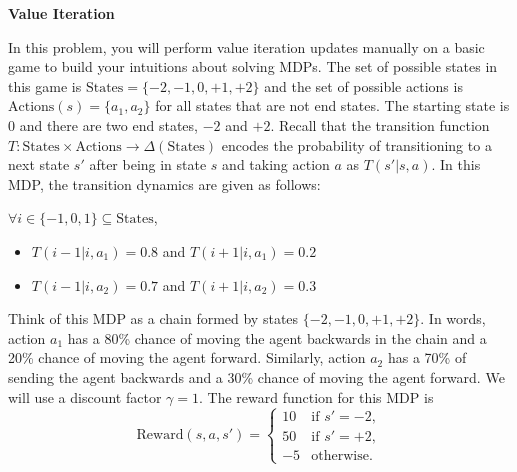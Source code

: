 \item {\bf Value Iteration}

In this problem, you will perform value iteration updates manually on a
basic game to build your intuitions about solving MDPs.
The set of possible states in this game is $\text{States} = \{-2, -1, 0, +1, +2\}$ and the set of possible actions is $\text{Actions}(s) = \{a_1, a_2\}$ for all states that are not end states.  The starting state is $0$ and there are two end states, $-2$ and $+2$. Recall that the transition function $T: \text{States} \times \text{Actions} \rightarrow \Delta(\text{States})$ encodes the probability of transitioning to a next state $s'$ after being in state $s$ and taking action $a$ as $T(s' \vert s,a)$. In this MDP, the transition dynamics are given as follows:

$\forall i \in \{-1, 0, 1\} \subseteq \text{States}$,

\begin{itemize}
  \item $T(i-1 \vert i, a_1) = 0.8$ and $T(i+1 \vert i, a_1) = 0.2$
  \item $T(i-1 \vert i, a_2) = 0.7$ and $T(i+1 \vert i, a_2) = 0.3$
\end{itemize}


Think of this MDP as a chain formed by states $\{-2, -1, 0, +1, +2\}$. In words, action $a_1$ has a 80\% chance of moving the agent backwards in the chain and a 20\% chance of moving the agent forward. Similarly, action $a_2$ has a 70\% of sending the agent backwards and a 30\% chance of moving the agent forward. We will use a discount factor $\gamma = 1$.
The reward function for this MDP is
$$\text{Reward}(s,a,s') = \begin{cases} 10 & \text{if } s' = -2, \\ 50 & \text{if } s' = +2, \\ -5 & \text{otherwise}. \end{cases}$$


\begin{enumerate}

  

  

\end{enumerate}
